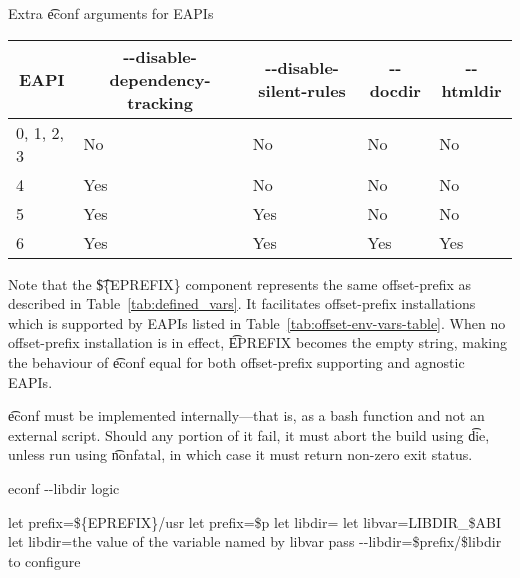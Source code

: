 \begin{description}
    \begin{centertable}{Extra \t{econf} arguments for EAPIs}
        \label{tab:econf-options-table}
        \begin{tabular}{lllll}
          \toprule
          \multicolumn{1}{c}{\textbf{EAPI}} &
          \multicolumn{1}{c}{\textbf{-{}-disable-dependency-tracking}} &
          \multicolumn{1}{c}{\textbf{-{}-disable-silent-rules}} &
          \multicolumn{1}{c}{\textbf{-{}-docdir}} &
          \multicolumn{1}{c}{\textbf{-{}-htmldir}} \\
          \midrule
          0, 1, 2, 3        & No  & No  & No  & No  \\
          4                 & Yes & No  & No  & No  \\
          5                 & Yes & Yes & No  & No  \\
          6                 & Yes & Yes & Yes & Yes \\
          \bottomrule
        \end{tabular}
    \end{centertable}

    Note that the \t{\$\{EPREFIX\}} component represents the same offset-prefix as described in
    Table~\ref{tab:defined_vars}.  It facilitates offset-prefix installations which is supported by
    EAPIs listed in Table~\ref{tab:offset-env-vars-table}. When no offset-prefix installation is in
    effect, \t{EPREFIX} becomes the empty string, making the behaviour of \t{econf} equal for both
    offset-prefix supporting and agnostic EAPIs.

    \t{econf} must be implemented internally---that is, as a bash function and not an external
    script. Should any portion of it fail, it must abort the build using \t{die}, unless run using
    \t{nonfatal}, in which case it must return non-zero exit status.

\begin{algorithm}
\caption{econf -{}-libdir logic} \label{alg:econf-libdir}
\begin{algorithmic}[1]
\STATE let prefix=\$\{EPREFIX\}/usr
    \STATE let prefix=\$p
\ENDIF
\STATE let libdir=
    \STATE let libvar=LIBDIR\_\$ABI
        \STATE let libdir=the value of the variable named by libvar
    \ENDIF
\ENDIF
{}
    \STATE pass -{}-libdir=\$prefix/\$libdir to configure
\ENDIF
\end{algorithmic}
\end{algorithm}


\end{description}
